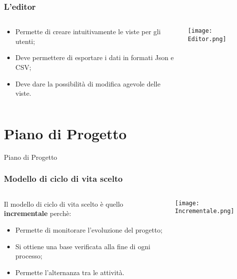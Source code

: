 \begin{frame}
  \frametitle{L'editor}
  \begin{columns}
    \begin{column}{0.5\textwidth}
      \begin{itemize}
      \item Permette di creare intuitivamente le viste per gli utenti;
      \item Deve permettere di esportare i dati in formati Json e CSV;
      \item Deve dare la possibilità di modifica agevole delle viste.
      \end{itemize}
    \end{column}
    \begin{column}{0.7\textwidth}
    	\centering
       \texttt{[image: Editor.png]}
    \end{column}
  \end{columns}
  
\end{frame}

\section{Piano di Progetto}
\begin{frame}
\begin{center}
    \huge Piano di Progetto
\end{center}
\end{frame}

\begin{frame}
  \frametitle{Modello di ciclo di vita scelto}

  \begin{columns}
    \begin{column}{0.6\textwidth}
      
      Il modello di ciclo di vita scelto è quello \textbf{incrementale} perchè:
      \begin{itemize}
      \item Permette di monitorare l'evoluzione del progetto;
      \item Si ottiene una base verificata alla fine di ogni processo;
      \item Permette l'alternanza tra le attività.
      \end{itemize}
    \end{column}
    \begin{column}{0.4\textwidth}
      \texttt{[image: Incrementale.png]}
    \end{column}
  \end{columns}
\end{frame}



